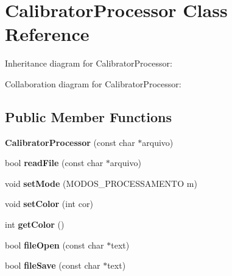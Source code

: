 \hypertarget{classCalibratorProcessor}{}\section{Calibrator\+Processor Class Reference}
\label{classCalibratorProcessor}


Inheritance diagram for Calibrator\+Processor\+:


Collaboration diagram for Calibrator\+Processor\+:
\subsection*{Public Member Functions}
\begin{DoxyCompactItemize}
\item 
{\bfseries Calibrator\+Processor} (const char $\ast$arquivo)\hypertarget{classCalibratorProcessor_ace59a3a67b37a7d611af92f63b462306}{}\label{classCalibratorProcessor_ace59a3a67b37a7d611af92f63b462306}

\item 
bool {\bfseries read\+File} (const char $\ast$arquivo)\hypertarget{classCalibratorProcessor_a11a3f298afd4a15230aeee8c79380fa3}{}\label{classCalibratorProcessor_a11a3f298afd4a15230aeee8c79380fa3}

\item 
void {\bfseries set\+Mode} (M\+O\+D\+O\+S\+\_\+\+P\+R\+O\+C\+E\+S\+S\+A\+M\+E\+N\+TO m)\hypertarget{classCalibratorProcessor_abf55f185e710cef3a3656985389ac7ab}{}\label{classCalibratorProcessor_abf55f185e710cef3a3656985389ac7ab}

\item 
void {\bfseries set\+Color} (int cor)\hypertarget{classCalibratorProcessor_a1e94fd0c082e2c399634f117c93f2e67}{}\label{classCalibratorProcessor_a1e94fd0c082e2c399634f117c93f2e67}

\item 
int {\bfseries get\+Color} ()\hypertarget{classCalibratorProcessor_afc601e80ef1923b6297dd96d630f938b}{}\label{classCalibratorProcessor_afc601e80ef1923b6297dd96d630f938b}

\item 
bool {\bfseries file\+Open} (const char $\ast$text)\hypertarget{classCalibratorProcessor_ac29b531eea7f8c69a1b41bfb7ca7a295}{}\label{classCalibratorProcessor_ac29b531eea7f8c69a1b41bfb7ca7a295}

\item 
bool {\bfseries file\+Save} (const char $\ast$text)\hypertarget{classCalibratorProcessor_a194c2cf8d04085e19b55b5b02c34cb96}{}\label{classCalibratorProcessor_a194c2cf8d04085e19b55b5b02c34cb96}


\end{DoxyCompactItemize}
